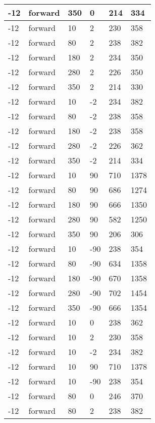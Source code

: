 \begin{table}
\begin{center}
\begin{tabular}{|l|l|l|l|l|l|}
			\hline
			-12 & forward & 350 & 0 & 214 & 334 \\
			\hline
			-12 & forward & 10 & 2 & 230 & 358 \\
			\hline
			-12 & forward & 80 & 2 & 238 & 382 \\
			\hline
			-12 & forward & 180 & 2 & 234 & 350 \\
			\hline
			-12 & forward & 280 & 2 & 226 & 350 \\
			\hline
			-12 & forward & 350 & 2 & 214 & 330 \\
			\hline
			-12 & forward & 10 & -2 & 234 & 382 \\
			\hline
			-12 & forward & 80 & -2 & 238 & 358 \\
			\hline
			-12 & forward & 180 & -2 & 238 & 358 \\
			\hline
			-12 & forward & 280 & -2 & 226 & 362 \\
			\hline
			-12 & forward & 350 & -2 & 214 & 334 \\
			\hline
			-12 & forward & 10 & 90 & 710 & 1378 \\
			\hline
			-12 & forward & 80 & 90 & 686 & 1274 \\
			\hline
			-12 & forward & 180 & 90 & 666 & 1350 \\
			\hline
			-12 & forward & 280 & 90 & 582 & 1250 \\
			\hline
			-12 & forward & 350 & 90 & 206 & 306 \\
			\hline
			-12 & forward & 10 & -90 & 238 & 354 \\
			\hline
			-12 & forward & 80 & -90 & 634 & 1358 \\
			\hline
			-12 & forward & 180 & -90 & 670 & 1358 \\
			\hline
			-12 & forward & 280 & -90 & 702 & 1454 \\
			\hline
			-12 & forward & 350 & -90 & 666 & 1354 \\
			\hline
			-12 & forward & 10 & 0 & 238 & 362 \\
			\hline
			-12 & forward & 10 & 2 & 230 & 358 \\
			\hline
			-12 & forward & 10 & -2 & 234 & 382 \\
			\hline
			-12 & forward & 10 & 90 & 710 & 1378 \\
			\hline
			-12 & forward & 10 & -90 & 238 & 354 \\
			\hline
			-12 & forward & 80 & 0 & 246 & 370 \\
			\hline
			-12 & forward & 80 & 2 & 238 & 382 \\
			\hline

\end{tabular}
\end{center}
\end{table}
